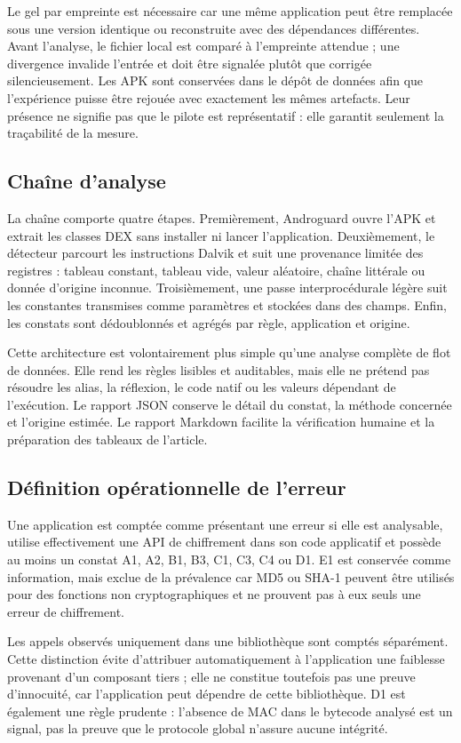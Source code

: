 \documentclass[conference,a4paper]{IEEEtran}
\begin{document}
Le gel par empreinte est nécessaire car une même application peut être remplacée sous une version identique ou reconstruite avec des dépendances différentes. Avant l'analyse, le fichier local est comparé à l'empreinte attendue ; une divergence invalide l'entrée et doit être signalée plutôt que corrigée silencieusement. Les APK sont conservées dans le dépôt de données afin que l'expérience puisse être rejouée avec exactement les mêmes artefacts. Leur présence ne signifie pas que le pilote est représentatif : elle garantit seulement la traçabilité de la mesure.

\subsection{Chaîne d'analyse}
La chaîne comporte quatre étapes. Premièrement, Androguard ouvre l'APK et extrait les classes DEX sans installer ni lancer l'application. Deuxièmement, le détecteur parcourt les instructions Dalvik et suit une provenance limitée des registres : tableau constant, tableau vide, valeur aléatoire, chaîne littérale ou donnée d'origine inconnue. Troisièmement, une passe interprocédurale légère suit les constantes transmises comme paramètres et stockées dans des champs. Enfin, les constats sont dédoublonnés et agrégés par règle, application et origine.

Cette architecture est volontairement plus simple qu'une analyse complète de flot de données. Elle rend les règles lisibles et auditables, mais elle ne prétend pas résoudre les alias, la réflexion, le code natif ou les valeurs dépendant de l'exécution. Le rapport JSON conserve le détail du constat, la méthode concernée et l'origine estimée. Le rapport Markdown facilite la vérification humaine et la préparation des tableaux de l'article.

\subsection{Définition opérationnelle de l'erreur}
Une application est comptée comme présentant une erreur si elle est analysable, utilise effectivement une API de chiffrement dans son code applicatif et possède au moins un constat A1, A2, B1, B3, C1, C3, C4 ou D1. E1 est conservée comme information, mais exclue de la prévalence car MD5 ou SHA-1 peuvent être utilisés pour des fonctions non cryptographiques et ne prouvent pas à eux seuls une erreur de chiffrement.

Les appels observés uniquement dans une bibliothèque sont comptés séparément. Cette distinction évite d'attribuer automatiquement à l'application une faiblesse provenant d'un composant tiers ; elle ne constitue toutefois pas une preuve d'innocuité, car l'application peut dépendre de cette bibliothèque. D1 est également une règle prudente : l'absence de MAC dans le bytecode analysé est un signal, pas la preuve que le protocole global n'assure aucune intégrité.
\end{document}
